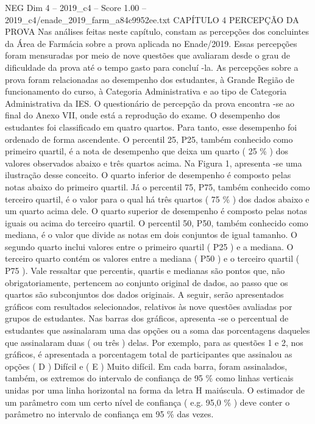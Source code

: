 \begin{textsample}{NEG Dim 4 – 2019\_c4 – Score 1.00 – 2019\_c4/enade\_2019\_farm\_a84c9952ee.txt}  \label{ex:f4_neg_243}
CAPÍTULO 4 PERCEPÇÃO DA PROVA Nas análises feitas neste capítulo, constam as percepções dos concluintes da Área de Farmácia sobre a prova aplicada no Enade/2019.
Essas percepções foram mensuradas por meio de nove questões que avaliaram desde o grau de dificuldade da prova até o tempo gasto para concluí -la.
As percepções sobre a prova foram relacionadas ao desempenho dos estudantes, à Grande Região de funcionamento do curso, à Categoria Administrativa e ao tipo de Categoria Administrativa da IES.
O questionário de percepção da prova encontra -se ao final do Anexo VII, onde está a reprodução do exame.
O desempenho dos estudantes foi classificado em quatro quartos.
Para tanto, esse desempenho foi ordenado de forma ascendente.
O percentil 25, P25, também conhecido como primeiro quartil, é a nota de desempenho que deixa um quarto ( 25 \% ) dos valores observados abaixo e três quartos acima.
Na Figura 1, apresenta -se uma ilustração desse conceito.
O quarto inferior de desempenho é composto pelas notas abaixo do primeiro quartil.
Já o percentil 75, P75, também conhecido como terceiro quartil, é o valor para o qual há três quartos ( 75 \% ) dos dados abaixo e um quarto acima dele.
O quarto superior de desempenho é composto pelas notas iguais ou acima do terceiro quartil.
O percentil 50, P50, também conhecido como mediana, é o valor que divide as notas em dois conjuntos de igual tamanho.
O segundo quarto inclui valores entre o primeiro quartil ( P25 ) e a mediana.
O terceiro quarto contém os valores entre a mediana ( P50 ) e o terceiro quartil ( P75 ).
Vale ressaltar que percentis, quartis e medianas são pontos que, não obrigatoriamente, pertencem ao conjunto original de dados, ao passo que os quartos são subconjuntos dos dados originais.
A seguir, serão apresentados gráficos com resultados selecionados, relativos às nove questões avaliadas por grupos de estudantes.
Nas barras dos gráficos, apresenta -se o percentual de estudantes que assinalaram uma das opções ou a soma das porcentagens daqueles que assinalaram duas ( ou três ) delas.
Por exemplo, para as questões 1 e 2, nos gráficos, é apresentada a porcentagem total de participantes que assinalou as opções ( D ) Difícil e ( E ) Muito difícil.
Em cada barra, foram assinalados, também, os extremos do intervalo de confiança de 95 \% como linhas verticais unidas por uma linha horizontal na forma da letra H maiúscula.
O estimador de um parâmetro com um certo nível de confiança ( e.g. 95,0 \% ) deve conter o parâmetro no intervalo de confiança em 95 \% das vezes.

\end{textsample}
